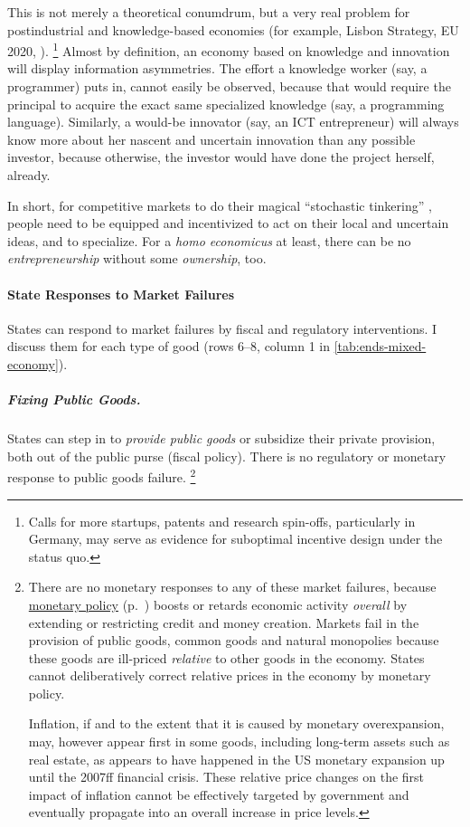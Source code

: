 This is not merely a theoretical conumdrum, but a very real problem for postindustrial  and knowledge-based economies (for example, Lisbon Strategy, EU 2020, \citealt{Bell-1973-aa}).
\footnote{
	Calls for more startups, patents and research spin-offs, particularly in Germany, may serve as evidence for suboptimal incentive design under the status quo.
}
Almost by definition, an economy based on knowledge and innovation will display information asymmetries.
The effort a knowledge worker (say, a programmer) puts in, cannot easily be observed, because that would require the principal to acquire the exact same specialized knowledge (say, a programming language).
Similarly, a would-be innovator (say, an \gls{ICT} entrepreneur) will always know more about her nascent and uncertain innovation than any possible investor, because otherwise, the investor would have done the project herself, already.

In short, for competitive markets to do their magical ``stochastic tinkering'' \citep[211]{Taleb2007}, people need to be equipped and incentivized to act on their local and uncertain ideas, and to specialize.
For a \emph{homo economicus} at least, there can be no \emph{entrepreneurship} without some \emph{ownership}, too.


\paragraph{State Responses to Market Failures}  \label{sec:state-responses}
States can respond to market failures by fiscal and regulatory interventions.
I discuss them for each type of good (rows 6--8, column 1 in \autoref{tab:ends-mixed-economy}).

\subparagraph{Fixing Public Goods.}  \label{sec:public-good-response}
States can step in to \emph{provide public goods} or subsidize their private provision, both out of the public purse (fiscal policy).
There is no regulatory or monetary response to public goods failure.
\footnote{
	\label{fn:monetary-commons}
	There are no monetary responses to any of these market failures, because \hyperref[sec:monetary]{monetary policy} (p.~\pageref{sec:monetary}) boosts or retards economic activity \emph{overall} by extending or restricting credit and money creation.
	Markets fail in the provision of public goods, common goods and natural monopolies because these goods are ill-priced \emph{relative} to other goods in the economy.
	States cannot deliberatively correct relative prices in the economy by monetary policy.

	Inflation, if and to the extent that it is caused by monetary overexpansion, may, however appear first in some goods, including long-term assets such as real estate, as appears to have happened in the US monetary expansion up until the 2007ff financial crisis.
	These relative price changes on the first impact of inflation cannot be effectively targeted by government and eventually propagate into an overall increase in price levels.
}


